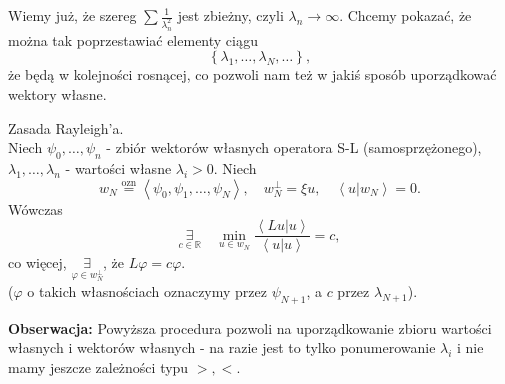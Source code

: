 \documentclass[../main.tex]{subfiles}
\begin{document}
		Wiemy już, że szereg $\sum \frac{1}{\lambda_n^2}$ jest zbieżny, czyli $\lambda_n \to \infty$. Chcemy pokazać, że można tak poprzestawiać elementy ciągu
		\[
				\left\{ \lambda_1,\ldots,\lambda_N,\ldots \right\}
		,\]
		że będą w kolejności rosnącej, co pozwoli nam też w jakiś sposób uporządkować wektory własne.
		\begin{stw}
				Zasada Rayleigh'a.\\
				Niech $\psi_0,\ldots,\psi_n$ - zbiór wektorów własnych operatora S-L (samosprzężonego), $\lambda_1,\ldots,\lambda_n$ - wartości własne $\lambda_i > 0$.
				Niech
				\[
				w_N \overset{\text{ozn}}{=} \left<\psi_0,\psi_1,\ldots,\psi_N \right>,\quad w_N^\perp = \xi u ,\quad \left<u|w_N \right> = 0
				.\]
				Wówczas
				\[
						\underset{c\in \mathbb{R}}{\exists}\quad \underset{u\in w_N}{\min} \frac{\left<Lu|u \right>}{\left<u|u \right>} = c
				,\]
				co więcej, $\underset{\varphi\in w_N^\perp}{\exists} $, że $L\varphi = c\varphi$.\\
				($\varphi$ o takich własnościach oznaczymy przez $\psi_{N+1}$, a $c$ przez $\lambda_{N+1}$).
		\end{stw}
		\textbf{Obserwacja:} Powyższa procedura pozwoli na uporządkowanie zbioru wartości własnych i wektorów własnych - na razie jest to tylko ponumerowanie $\lambda_i$ i nie mamy jeszcze zależności typu $>,<$.
\end{document}
